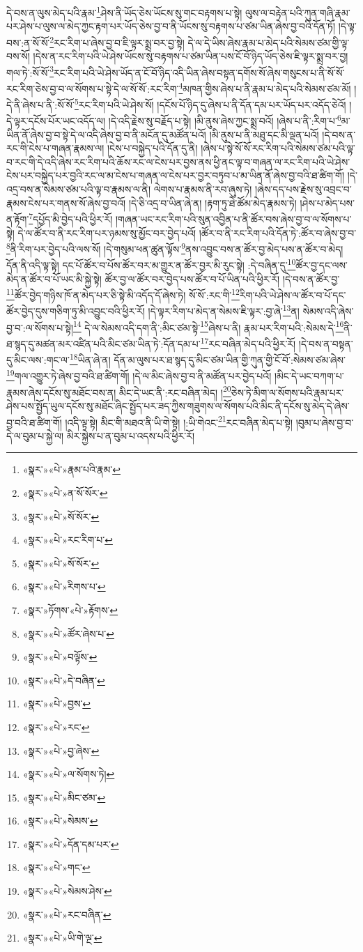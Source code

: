 དེ་བས་ན་ལུས་མེད་པའི་རྣམ་\footnote{«སྣར་»«པེ་»རྣམ་པའི་རྣམ་}ཤེས་ནི་ཡོད་ཅེས་ཡོངས་སུ་གང་བརྟགས་པ་སྟེ། ལུས་ལ་བརྟེན་པའི་ཀུན་གཞི་རྣམ་པར་ཤེས་པ་ལུས་ལ་མེད་ཀྱང་རྟག་པར་ཡོད་ཅེས་བྱ་བ་ནི་ཡོངས་སུ་བརྟགས་པ་ཙམ་ཡིན་ཞེས་བྱ་བའི་དོན་ཏོ། །དེ་ལྟ་བས་:ན་སོ་སོ་\footnote{«སྣར་»«པེ་»ན་སོ་སོར་}རང་རིག་པ་ཞེས་བྱ་བ་ཇི་ལྟར་སྨྲ་བར་བྱ་སྟེ། དེ་ལ་དེ་ཡིས་ཞེས་རྣམ་པ་མེད་པའི་སེམས་ཙམ་གྱི་ལྟ་བས་སོ། །དེས་ན་རང་རིག་པའི་ཡེ་ཤེས་ཡོངས་སུ་བརྟགས་པ་ཙམ་ཡིན་པས་ངོ་བོ་ཉིད་ཡོད་ཅེས་ཇི་ལྟར་སྨྲ་བར་བྱ། གལ་ཏེ་:སོ་སོ་\footnote{«སྣར་»«པེ་»སོ་སོར་}རང་རིག་པའི་ཡེ་ཤེས་ཡོད་ན་ངོ་བོ་ཉིད་འདི་ཡིན་ཞེས་བསྟན་དགོས་སོ་ཞེས་གསུངས་པ་ནི་སོ་སོ་རང་རིག་ཅེས་བྱ་བ་ལ་སོགས་པ་སྟེ་དེ་ལ་སོ་སོ་:རང་རིག་\footnote{«སྣར་»«པེ་»རང་རིག་པ་}མཁན་གྱིས་ཞེས་པ་ནི་རྣམ་པ་མེད་པའི་སེམས་ཙམ་མོ། །དེ་ནི་ཞེས་པ་ནི་:སོ་སོ་\footnote{«སྣར་»«པེ་»སོ་སོར་}རང་རིག་པའི་ཡེ་ཤེས་སོ། །དངོས་པོ་ཉིད་དུ་ཞེས་པ་ནི་དོན་དམ་པར་ཡོད་པར་འདོད་ཅེའོ། །དེ་ལྟར་དངོས་པོར་ཡང་འདོད་ལ། །དེ་འདི་རྗེས་སུ་བརྗོད་པ་སྟེ། །མི་ནུས་ཞེས་ཀྱང་སྨྲ་བའོ། །ཞེས་པ་ནི་:རིག་པ་\footnote{«སྣར་»«པེ་»རིགས་པ་}མ་ཡིན་ནོ་ཞེས་བྱ་བ་སྟེ་དེ་ལ་འདི་ཞེས་བྱ་བ་ནི་མངོན་དུ་མཚོན་པའོ། །མི་ནུས་པ་ནི་མཐུ་དང་མི་ལྡན་པའོ། །དེ་བས་ན་རང་གི་ངེས་པ་གཞན་རྣམས་ལ། །ངེས་པ་བསྐྱེད་པའི་དོན་དུ་ནི། །ཞེས་པ་སྟེ་སོ་སོ་རང་རིག་པའི་སེམས་ཙམ་པའི་ལྟ་བ་རང་གི་དེ་འདི་ཞེས་རང་རིག་པའི་ཆོས་རང་ལ་ངེས་པར་བྱས་ནས་ཕྱི་ནང་ལྟ་བ་གཞན་ལ་རང་རིག་པའི་ཡེ་ཤེས་ངེས་པར་བསྐྱེད་པར་བྱའི་རང་ལ་མ་ངེས་པ་གཞན་ལ་ངེས་པར་བྱར་བཏུབ་པ་མ་ཡིན་ནོ་ཞེས་བྱ་བའི་ཐ་ཚིག་གོ། །དེ་འདྲ་བས་ན་སེམས་ཙམ་པའི་ལྟ་བ་རྣམས་ལ་ནི། ལེགས་པ་རྣམས་ནི་རབ་ཞུས་ཏེ། །ཞེས་དད་པས་རྗེས་སུ་འབྲང་བ་རྣམས་ངེས་པར་གནས་སོ་ཞེས་བྱ་བའོ། །དེ་ཅི་འདྲ་བ་ཡིན་ཞེ་ན། །རྟག་ཏུ་ཐེ་ཚོམ་མེད་རྣམས་ཏེ། །ཤེས་པ་མེད་པས་ན་རྟོག་\footnote{«སྣར་»ཏོགས་«པེ་»རྟོགས་}དཔྱོད་མི་བྱེད་པའི་ཕྱིར་རོ། །གཞན་ཡང་རང་རིག་པའི་སུན་འབྱིན་པ་ནི་ཚོར་བས་ཞེས་བྱ་བ་ལ་སོགས་པ་སྟེ། དེ་ལ་ཚོར་བ་ནི་རང་རིག་པར་ཉམས་སུ་མྱོང་བར་བྱེད་པའོ། །ཚོར་བ་ནི་རང་རིག་པའི་དོན་ཏེ་:ཚོར་བ་ཞེས་བྱ་བ་\footnote{«སྣར་»«པེ་»ཚོར་ཞེས་པ་}ནི་རིག་པར་བྱེད་པའི་ལས་སོ། །དེ་གསུམ་ཕན་ཚུན་ལྟོས་\footnote{«སྣར་»«པེ་»བལྟོས་}ནས་འབྱུང་བས་ན་ཚོར་བྱ་མེད་པས་ན་ཚོར་བ་མེད། དོན་ནི་འདི་ལྟ་སྟེ། དང་པོ་ཚོར་བ་པོས་ཚོར་བར་མ་གྱུར་ན་ཚོར་བྱར་མི་རུང་སྟེ། :དེ་བཞིན་དུ་\footnote{«སྣར་»«པེ་»དེ་བཞིན་}ཚོར་བྱ་དང་ལས་མེད་ན་ཚོར་བ་པོ་ཡང་མི་སྐྱེ་སྟེ། ཚོར་བྱ་ལ་ཚོར་བར་བྱེད་པས་ཚོར་བ་པོ་ཡིན་པའི་ཕྱིར་རོ། །དེ་བས་ན་ཚོར་བྱ་\footnote{«སྣར་»«པེ་»བྱས་}ཚོར་བྱེད་གཉིས་ཁོ་ན་མེད་པར་ཅི་སྟེ་མི་འདོད་དོ་ཞེས་ཏེ། སོ་སོ་:རང་གི་\footnote{«སྣར་»«པེ་»རང་}རིག་པའི་ཡེ་ཤེས་ལ་ཚོར་བ་པོ་དང་ཚོར་བྱེད་དུས་གཅིག་ཏུ་མི་འབྱུང་བའི་ཕྱིར་རོ། །དེ་ལྟར་རིག་པ་མེད་ན་སེམས་ཇི་ལྟར་:བྱ་ཞེ་\footnote{«སྣར་»«པེ་»བྱ་ཞེས་}ན། སེམས་འདི་ཞེས་བྱ་བ་:ལ་སོགས་པ་སྟེ།\footnote{«སྣར་»«པེ་»ལ་སོགས་ཏེ།} དེ་ལ་སེམས་འདི་དག་ནི་:མིང་ཙམ་སྟེ་\footnote{«སྣར་»«པེ་»མིང་ཙམ་}ཞེས་པ་ནི། རྣམ་པར་རིག་པའི་:སེམས་དེ་\footnote{«སྣར་»«པེ་»སེམས་}ནི་ཐ་སྙད་དུ་མཚན་མར་འཛིན་པའི་མིང་ཙམ་ཡིན་ཏེ་:དོན་དམ་པ་\footnote{«སྣར་»«པེ་»དོན་དམ་པར་}རང་བཞིན་མེད་པའི་ཕྱིར་རོ། །དེ་བས་ན་བསྟན་དུ་མིང་ལས་:གང་ལ་\footnote{«སྣར་»«པེ་»གང་}ཡིན་ཞེ་ན། དོན་མ་ལུས་པར་ཐ་སྙད་དུ་མིང་ཙམ་ཡིན་གྱི་ཀུན་གྱི་ངོ་བོ་:སེམས་ཙམ་ཞེས་\footnote{«སྣར་»«པེ་»སེམས་ཤེས་}གལ་འགྱུར་ཏེ་ཞེས་བྱ་བའི་ཐ་ཚིག་གོ། །དེ་ལ་མིང་ཞེས་བྱ་བ་ནི་མཚོན་པར་བྱེད་པའོ། །མིང་དེ་ཡང་བཀག་པ་རྣམས་ཞེས་དངོས་སུ་མཐོང་བས་ན། མིང་དེ་ཡང་ནི་:རང་བཞིན་མེད། །\footnote{«སྣར་»«པེ་»རང་བཞིན་}ཅེས་ཏེ་མིག་ལ་སོགས་པའི་རྣམ་པར་ཤེས་པས་སྤྱོད་ཡུལ་དངོས་སུ་མཐོང་ཞིང་སྤྱོད་པར་ཟད་ཀྱིས་གཟུགས་ལ་སོགས་པའི་མིང་ནི་དངོས་སུ་མེད་དེ་ཞེས་བྱ་བའི་ཐ་ཚིག་གོ། །འདི་ལྟ་སྟེ། མིང་གི་མཐའ་ནི་ཡི་གེ་སྟེ། །:ཡི་གེའང་\footnote{«སྣར་»«པེ་»ཡི་གེ་ལྔ་}རང་བཞིན་མེད་པ་སྟེ། །བུམ་པ་ཞེས་བྱ་བ་དེ་ལ་བུམ་པ་སྐྱེ་ལ། མིར་སྐྱེས་པ་ན་བུམ་པ་འདས་པའི་ཕྱིར་རོ། 